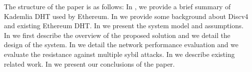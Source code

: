 The structure of the paper is as follows: In , we provide a brief summary of Kademlia DHT used by Ethereum. In  we provide some background about Discv4 and existing Ethereum DHT. 
In  we present the system model and assumptions. 
In  we first describe the overview of the proposed solution and  we detail the design of the system. 
In  we detail the network performance evaluation and we evaluate the resistance against multiple sybil attacks. 
In  we describe existing related work.
In  we present our conclusions of the paper.







